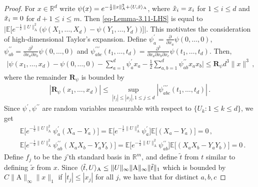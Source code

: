 \documentclass[11pt]{article}
\numberwithin{equation}{section}
\begin{document}
\begin{proof}
For $x\in \mathbb R^d$ write $\psi(x) =  e^{-\frac{1}{2} \| x \|^2_{\mathrm{A}} + \langle U, \Tilde{x} \rangle_{\mathrm{A}} }$, where $\Tilde{x}_i = x_i$ for $1 \leq i \leq d$ and $\Tilde{x}_i=0$ for $d+1 \leq i \leq m$. Then \eqref{eq-Lemma-3.11-LHS} is equal to $\big| \mathbb{E}  \big[ e^{- \frac{1}{2} \| U \|^2_{\mathrm{A}} } \big( \psi( X_1,\ldots,X_d) - \psi(Y_1,\ldots,Y_d) \big) \big] \big|$.
This motivates the consideration of high-dimensional Taylor's expansion. Define $\psi^{\prime}_a = \frac{\partial}{\partial x_a}\psi(0,\ldots,0)$, $\psi^{\prime \prime}_{ab} = \frac{\partial^2}{\partial x_a \partial x_b} \psi(0,\ldots,0)$ and $\psi^{\prime \prime \prime}_{abc}(t_1,\ldots,t_d) = \frac{\partial^3}{\partial x_a \partial x_b \partial x_c} \psi(t_1,\ldots,t_d)$. Then,
\begin{align*}
    \Big| \psi(x_1,\ldots,x_d) - \psi(0,\ldots,0) - \sum_{a=1}^{d} \psi^{\prime}_{a} x_a - \frac{1}{2} \sum_{a,b=1}^{d}  \psi^{\prime \prime}_{ab} x_a x_b \Big| \leq  \mathbf{R}_{\psi} d^3 \| x \|^3 \,,
\end{align*}
where the remainder $\mathbf{R}_{\psi}$ is bounded by
\begin{align}\label{eq-high-dimensional-taylor-expansion}
    |\mathbf{R}_{\psi}(x_1,\ldots,x_d)| \leq \sup_{ |t_j| \leq |x_j|, 1 \leq j \leq d } | \psi^{\prime \prime \prime}_{abc}(t_1,\ldots,t_d) | \,.
\end{align}
Since $\psi^{\prime}, \psi^{\prime \prime}$ are random variables measurable with respect to $\{ U_k: 1 \leq k \leq d \}$, we get
\begin{equation}\label{eq-first-two-derivaties-0}
\begin{aligned}
    & \mathbb{E} \Big[ e^{-\frac{1}{2} \| U \|^2_{ \mathrm{A} } } \psi^{\prime}_a (X_a-Y_a) \Big] = \mathbb{E} \Big[ e^{-\frac{1}{2} \| U \|^2_{ \mathrm{A} } } \psi^{\prime}_a \Big] \mathbb{E} \Big[ (X_a-Y_a) \Big] = 0 \,, \\
    & \mathbb{E} \Big[ e^{-\frac{1}{2} \| U \|^2_{ \mathrm{A} } } \psi^{\prime \prime}_{ab} (X_a X_b-Y_a Y_b) \Big] = \mathbb{E} \Big[ e^{-\frac{1}{2} \| U \|^2_{ \mathrm{A} } } \psi^{\prime \prime}_{ab} \Big] \mathbb{E} \Big[ (X_a X_b-Y_a Y_b) \Big] = 0 \,.
\end{aligned}
\end{equation}
Define $f_j$ to  be the $j$'th standard basis in $\mathbb{R}^{m}$, and define $\tilde t$ from $t$ similar to defining $\tilde x$ from $x$. Since $\langle \Tilde{t}, U \rangle_{\mathrm{A}} \leq \| U \|_{\infty} \| \mathrm{A} \|_{\infty} \| \Tilde{t} \|_{1}$ which is bounded by $C \| \mathrm{A} \|_{\infty} \| x \|_1$ if $|t_j| \leq |x_j|$ for all $j$,  we have that for distinct $a, b, c$

\end{proof}
\end{document}
